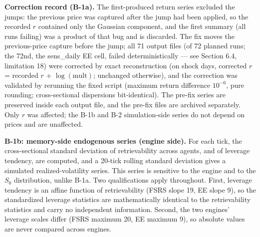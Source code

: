 \documentclass[11pt]{article}
\begin{document}
\textbf{Correction record (B-1a).} The first-produced return series excluded the jumps: the previous price was captured after the jump had been applied, so the recorded $r$ contained only the Gaussian component, and the first summary (all runs failing) was a product of that bug and is discarded. The fix moves the previous-price capture before the jump; all 71 output files (of 72 planned runs; the 72nd, the sens\_daily EE cell, failed deterministically --- see Section 6.4, limitation 18) were corrected by exact reconstruction (on shock days, corrected $r$ = recorded $r$ + $\log(\mathrm{mult})$; unchanged otherwise), and the correction was validated by rerunning the fixed script (maximum return difference $10^{-6}$, pure rounding; cross-sectional dispersions bit-identical). The pre-fix series are preserved inside each output file, and the pre-fix files are archived separately. Only $r$ was affected; the B-1b and B-2 simulation-side series do not depend on prices and are unaffected.

\textbf{B-1b: memory-side endogenous series (engine side).} For each tick, the cross-sectional standard deviation of retrievability across agents, and of leverage tendency, are computed, and a 20-tick rolling standard deviation gives a simulated realized-volatility series. This series is sensitive to the engine and to the $S_0$ distribution, unlike B-1a. Two qualifications apply throughout. First, leverage tendency is an affine function of retrievability (FSRS slope 19, EE slope 9), so the standardized leverage statistics are mathematically identical to the retrievability statistics and carry no independent information. Second, the two engines' leverage scales differ (FSRS maximum 20, EE maximum 9), so absolute values are never compared across engines.
\end{document}
